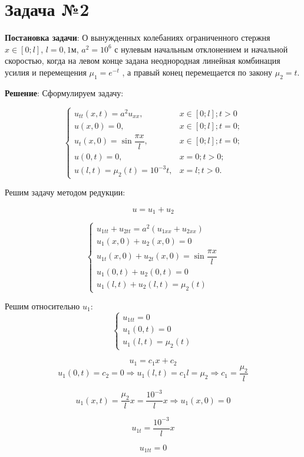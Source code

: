 \section{Задача №2}
\textbf{Постановка задачи}:
О вынужденных колебаниях ограниченного стержня $x\in[0;l]$, $l = 0,1$м, $a^{2} = 10^{6}$ с нулевым начальным отклонением и начальной скоростью, когда на левом конце задана неоднородная линейная комбинация усилия и перемещения $\mu_{1} = e^{-t}$ , а правый конец перемещается по закону $\mu_{2} = t$.

\textbf{Решение}:
Сформулируем задачу:

$$
\begin{cases}
u_{tt}(x, t) = a^{2}u_{xx},&\text{$x\in[0;l]; t > 0$}\\
u(x, 0) = 0,&\text{$x\in[0;l]; t = 0$;}\\
u_{t}(x, 0) = \sin{\dfrac{\pi x}{l}},&\text{$x\in[0;l]; t = 0$;}\\
u(0, t) = 0,&\text{$x=0; t > 0$;}\\
u(l, t) = \mu_{2}(t) = 10^{-3}t,&\text{$x=l; t > 0$.}
\end{cases}
$$

Решим задачу методом редукции:

$$ u = u_{1} + u_{2}$$

$$
\begin{cases}
u_{1tt} + u_{2tt} = a^{2}(u_{1xx} + u_{2xx})\\
u_{1}(x, 0) + u_{2}(x, 0) = 0\\
u_{1t}(x, 0) + u_{2t}(x, 0) = \sin{\dfrac{\pi x}{l}}\\
u_{1}(0, t) + u_{2}(0, t) = 0\\
u_{1}(l, t) + u_{2}(l, t) = \mu_{2}(t)
\end{cases}
$$

Решим относительно $u_{1}$:
$$
\begin{cases}
u_{1tt} = 0\\
u_{1}(0, t) = 0\\
u_{1}(l, t) = \mu_{2}(t)
\end{cases}
$$

$$ u_{1} = c_{1}x + c_{2}$$
$$ u_{1}(0, t)  = c_{2} = 0 \Rightarrow u_{1}(l, t) = c_{1}l = \mu_{2} \Rightarrow c_{1} = \dfrac{\mu_{2}}{l}$$

$$ u_{1}(x, t) = \dfrac{\mu_{2}}{l} x = \dfrac{10^{-3}}{l} x \Rightarrow u_{1}(x, 0) = 0$$

$$ u_{1t} = \dfrac{10^{-3}}{l} x$$

$$ u_{1tt} = 0$$

